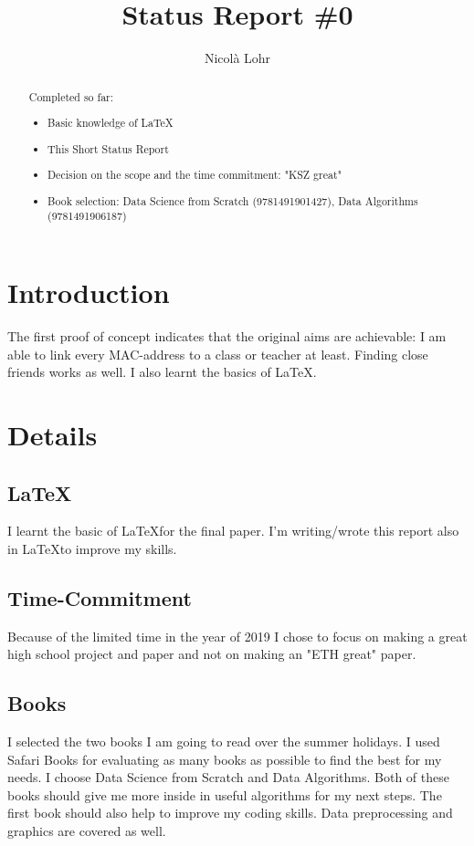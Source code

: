 \documentclass{article}
\begin{document}
\title{Status Report \#0}
\author{Nicolà Lohr}

 \maketitle
\newpage
\begin{abstract}

Completed so far:
\begin{itemize}
\item Basic knowledge of \LaTeX
\item This Short Status Report
\item Decision on the scope and the time commitment: "KSZ great"
\item Book selection: Data Science from Scratch (9781491901427), Data Algorithms (9781491906187)
\end{itemize}
\end{abstract}
\section{Introduction}
The first proof of concept indicates that the original aims are achievable: I am able to link every MAC-address to a class or teacher at least. Finding close friends works as well. I also learnt the basics of \LaTeX.
\section{Details}
\subsection{\LaTeX}
I learnt the basic of \LaTeX for the final paper. I'm writing/wrote this report also in \LaTeX to improve my skills. 
\subsection{Time-Commitment}
Because of the limited time in the year of 2019 I chose to focus on making a great high school project and paper and not on making an "ETH great" paper.
\subsection{Books}
I selected the two books I am going to read over the summer holidays. I used Safari Books for evaluating as many books as possible to find the best for my needs. I choose Data Science from Scratch and Data Algorithms. Both of these books should give me more inside in useful algorithms for my next steps. The first book should also help to improve my coding skills. Data preprocessing and graphics are covered as well.
\end{document}
